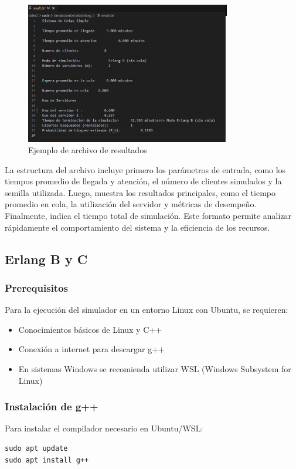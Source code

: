 \documentclass{article}
\begin{document}
\begin{figure}[H]
    \centering
    \includegraphics[width=0.8\textwidth]{images/manualUsuarioErlangBC_5.png}
    \caption{Ejemplo de archivo de resultados}
    \label{fig:resultados_mm1}
\end{figure}

La estructura del archivo incluye primero los parámetros de entrada, como los tiempos promedio de llegada y atención, el número de clientes simulados y la semilla utilizada. Luego, muestra los resultados principales, como el tiempo promedio en cola, la utilización del servidor y métricas de desempeño. Finalmente, indica el tiempo total de simulación. Este formato permite analizar rápidamente el comportamiento del sistema y la eficiencia de los recursos.

\subsection{Erlang B y C}\label{subsec:erlang_bc}

\subsubsection{Prerequisitos}
Para la ejecución del simulador en un entorno Linux con Ubuntu, se requieren:
\begin{itemize}
    \item Conocimientos básicos de Linux y C++
    \item Conexión a internet para descargar g++
    \item En sistemas Windows se recomienda utilizar WSL (Windows Subsystem for Linux)
\end{itemize}

\subsubsection{Instalación de g++}
Para instalar el compilador necesario en Ubuntu/WSL:
\begin{verbatim}
sudo apt update
sudo apt install g++
\end{verbatim}
\end{document}
